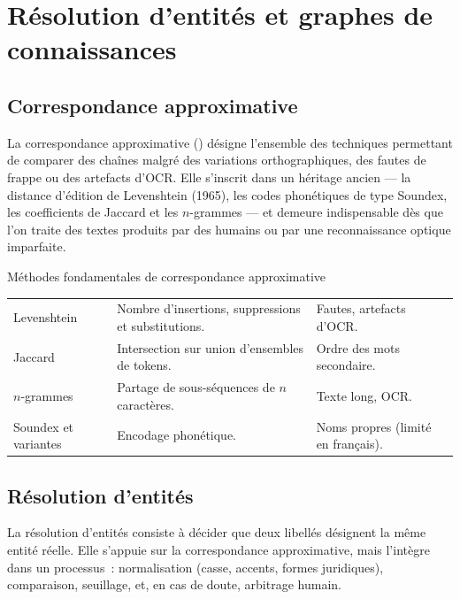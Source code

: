 \section{Résolution d'entités et graphes de connaissances}
\label{sec:ch1-entites}

\subsection{Correspondance approximative}

La correspondance approximative () désigne l'ensemble
des techniques permettant de comparer des chaînes malgré des variations
orthographiques, des fautes de frappe ou des artefacts d'OCR. Elle
s'inscrit dans un héritage ancien --- la distance d'édition de Levenshtein
(1965), les codes phonétiques de type Soundex, les coefficients de Jaccard
et les $n$-grammes --- et demeure indispensable dès que l'on traite des
textes produits par des humains ou par une reconnaissance optique imparfaite.

\begin{btptable}{Méthodes fondamentales de correspondance approximative}
\label{tab:fuzzy}
\begin{tabularx}{\linewidth}{@{}L{2.8cm} Y L{3.6cm}@{}}
\toprule
{}
 &  &  \\
\midrule
Levenshtein & Nombre d'insertions, suppressions et substitutions. & Fautes, artefacts d'OCR. \\
Jaccard & Intersection sur union d'ensembles de tokens. & Ordre des mots secondaire. \\
$n$-grammes & Partage de sous-séquences de $n$ caractères. & Texte long, OCR. \\
Soundex et variantes & Encodage phonétique. & Noms propres (limité en français). \\
\bottomrule
\end{tabularx}
\end{btptable}

\subsection{Résolution d'entités}

La résolution d'entités consiste à décider que deux libellés désignent la
même entité réelle. Elle s'appuie sur la correspondance approximative, mais
l'intègre dans un processus~: normalisation (casse, accents, formes
juridiques), comparaison, seuillage, et, en cas de doute, arbitrage humain.

